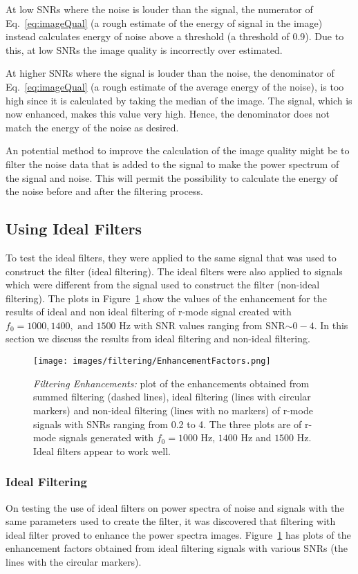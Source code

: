 \documentclass[%
reprint,
amsmath,amssymb,
aps,
]{revtex4-1}
\begin{document}
	At low SNRs where the noise is louder than the signal, the numerator of Eq.~\ref{eq:imageQual} (a rough estimate of the energy of signal in the image) instead calculates energy of noise above a threshold (a threshold of 0.9). Due to this, at low SNRs the image quality is incorrectly over estimated. 
	
	
	At higher SNRs where the signal is louder than the noise, the denominator of Eq.~\ref{eq:imageQual} (a rough estimate of the average energy of the noise), is too high since it is calculated by taking the median of the image. The signal, which is now enhanced, makes this value very high. Hence, the denominator does not match the energy of the noise as desired.
	
	An potential method to improve the calculation of the image quality might be to filter the noise data that is added to the signal to make the power spectrum of the signal and noise. This will permit the possibility to calculate the energy of the noise before and after the filtering process.
	
	\subsection{Using Ideal Filters}
	To test the ideal filters, they were applied to the same signal that was used to construct the filter (ideal filtering). The ideal filters were also applied to signals which were different from the signal used to construct the filter (non-ideal filtering). The plots in Figure~\ref{fig:allFilters} show the values of the enhancement for the results of ideal and non ideal filtering of r-mode signal created with $f_0 = 1000, 1400, \text{ and } 1500 \text{ Hz}$ with SNR values ranging from SNR$\sim0-4$. In this section we discuss the results from ideal filtering and non-ideal filtering. 
	
	\begin{figure}[h!]
		\centering
		\texttt{[image: images/filtering/EnhancementFactors.png]}
		\caption{\textit{Filtering Enhancements:} plot of the enhancements obtained from summed filtering (dashed lines), ideal filtering (lines with circular markers) and non-ideal filtering (lines with no markers) of r-mode signals with SNRs ranging from 0.2 to 4. The three plots are of r-mode signals generated with $f_0 = 1000$ Hz, $1400$ Hz and $1500$ Hz. Ideal filters appear to work well.}
		\label{fig:allFilters}
	\end{figure}
	
	
	\subsubsection{Ideal Filtering}
	On testing the use of ideal filters on power spectra of noise and signals with the same parameters used to create the filter, it was discovered that filtering with ideal filter proved to enhance the power spectra images. Figure~\ref{fig:allFilters} has plots of the enhancement factors obtained from ideal filtering signals with various SNRs (the lines with the circular markers). 
	
\end{document}
